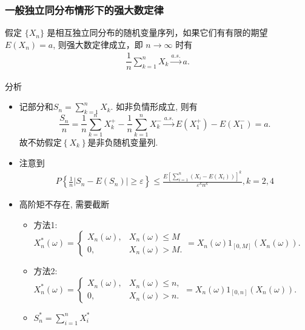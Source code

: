 \begin{frame}
	\frametitle{一般独立同分布情形下的强大数定律}
		\begin{thm}
		假定 $\{X_n\}$ 是相互独立同分布的随机变量序列，如果它们有有限的期望 $E (X_n)=a$, 则强大数定律成立，即 $n\rightarrow\infty$ 时有
		\begin{eqnarray*}
			\dfrac{1}{n}\sum_{k=1}^nX_k\stackrel{a.s.}{\rightarrow} a.
		\end{eqnarray*}
	\end{thm}

	\pause





\end{frame}

\begin{frame}{分析}
	\begin{itemize}[<+-|alert@+>]
	\item 记部分和${S_{n}=\sum_{k=1}^{n} X_{k}}$. 如非负情形成立, 则有
	\[
	\frac{S_{n}}{n}=\frac{1}{n} \sum_{k=1}^{n} X_{k}^{+}-\frac{1}{n} \sum_{k=1}^{n} X_{k}^{-} \stackrel{a.s.}{\longrightarrow} E\left(X_{1}^{+}\right)-E\left(X_{1}^{-}\right)=a .
	\]
	故不妨假定${\left\{X_{k}\right\}}$是非负随机变量列.

	\item 注意到
	\begin{align*}
		P\left\{\frac{1}{n}\left|S_{n}-E\left(S_{n}\right)\right| \geq \varepsilon\right\} \leq \frac{E[\sum_{i=1}^n(X_i-E(X_i))]^k}{\varepsilon^{k}n^k}, k=2, 4%
	\end{align*}
	\item 高阶矩不存在, 需要截断

	\begin{itemize}[<+-|alert@+>]
	\item 方法1: $X_{n}^{*}(\omega)={\left\{\begin{array}{ll}
		X_{n}(\omega), &     X_{n}(\omega) \leq M \\
		0, &     X_{n}(\omega)>M .
		\end{array}=X_{n}(\omega) 1_{[0, M]}\left(X_{n}(\omega)\right) .\right.}$ %
	\item 方法2: $X_{n}^{*}(\omega)={\left\{\begin{array}{ll}
		X_{n}(\omega), &     X_{n}(\omega) \leq n, \\
		0, &     X_{n}(\omega)>n .
		\end{array}=X_{n}(\omega) 1_{[0, n]}\left(X_{n}(\omega)\right) .\right.}$
	\item $S_n^*=\sum_{i=1}^nX_i^*$
	\end{itemize}

	\end{itemize}
\end{frame}

